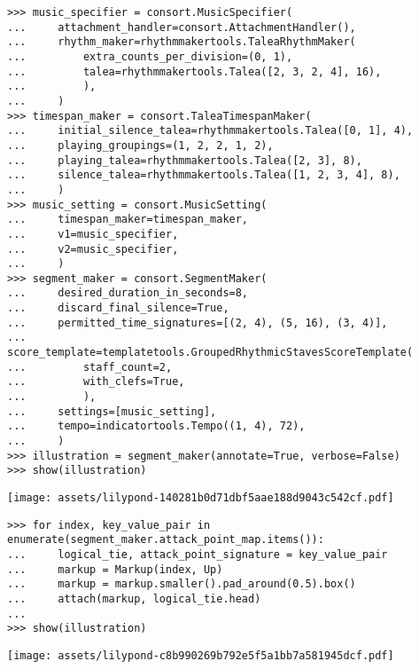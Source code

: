 \begin{abjadbookoutput}
\begin{singlespacing}
\vspace{-0.5\baselineskip}
\begin{lstlisting}
>>> music_specifier = consort.MusicSpecifier(
...     attachment_handler=consort.AttachmentHandler(),
...     rhythm_maker=rhythmmakertools.TaleaRhythmMaker(
...         extra_counts_per_division=(0, 1),
...         talea=rhythmmakertools.Talea([2, 3, 2, 4], 16),
...         ),
...     )
>>> timespan_maker = consort.TaleaTimespanMaker(
...     initial_silence_talea=rhythmmakertools.Talea([0, 1], 4),
...     playing_groupings=(1, 2, 2, 1, 2),
...     playing_talea=rhythmmakertools.Talea([2, 3], 8),
...     silence_talea=rhythmmakertools.Talea([1, 2, 3, 4], 8),
...     )
>>> music_setting = consort.MusicSetting(
...     timespan_maker=timespan_maker,
...     v1=music_specifier,
...     v2=music_specifier,
...     )
>>> segment_maker = consort.SegmentMaker(
...     desired_duration_in_seconds=8,
...     discard_final_silence=True,
...     permitted_time_signatures=[(2, 4), (5, 16), (3, 4)],
...     score_template=templatetools.GroupedRhythmicStavesScoreTemplate(
...         staff_count=2,
...         with_clefs=True,
...         ),
...     settings=[music_setting],
...     tempo=indicatortools.Tempo((1, 4), 72),
...     )
>>> illustration = segment_maker(annotate=True, verbose=False)
>>> show(illustration)
\end{lstlisting}
\noindent\texttt{[image: assets/lilypond-140281b0d71dbf5aae188d9043c542cf.pdf]}
\end{singlespacing}
\end{abjadbookoutput}

\begin{comment}
<abjad>[stylesheet=../consort.ily]
for index, key_value_pair in enumerate(segment_maker.attack_point_map.items()):
    logical_tie, attack_point_signature = key_value_pair
    markup = Markup(index, Up)
    markup = markup.smaller().pad_around(0.5).box()
    attach(markup, logical_tie.head)

show(illustration)
</abjad>
\end{comment}

\begin{abjadbookoutput}
\begin{singlespacing}
\vspace{-0.5\baselineskip}
\begin{lstlisting}
>>> for index, key_value_pair in enumerate(segment_maker.attack_point_map.items()):
...     logical_tie, attack_point_signature = key_value_pair
...     markup = Markup(index, Up)
...     markup = markup.smaller().pad_around(0.5).box()
...     attach(markup, logical_tie.head)
...
>>> show(illustration)
\end{lstlisting}
\noindent\texttt{[image: assets/lilypond-c8b990269b792e5f5a1bb7a581945dcf.pdf]}
\end{singlespacing}
\end{abjadbookoutput}


